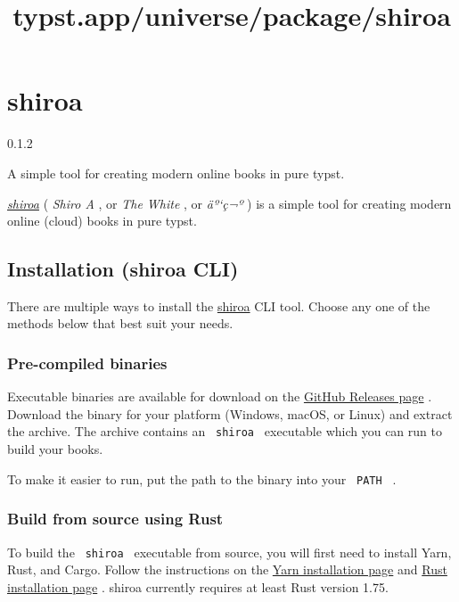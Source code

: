 \title{typst.app/universe/package/shiroa}

\label{banner}
\section{shiroa}\label{shiroa}

{ 0.1.2 }

A simple tool for creating modern online books in pure typst.

\label{readme}
\href{https://github.com/Myriad-Dreamin/shiroa}{\emph{shiroa}} (
\emph{Shiro A} , or \emph{The White} , or \emph{äº`ç¬º} ) is a simple
tool for creating modern online (cloud) books in pure typst.

\subsection{Installation (shiroa CLI)}\label{installation-shiroa-cli}

There are multiple ways to install the
\href{https://github.com/Myriad-Dreamin/shiroa}{shiroa} CLI tool. Choose
any one of the methods below that best suit your needs.

\subsubsection{Pre-compiled binaries}\label{pre-compiled-binaries}

Executable binaries are available for download on the
\href{https://github.com/Myriad-Dreamin/shiroa/releases}{GitHub Releases
page} . Download the binary for your platform (Windows, macOS, or Linux)
and extract the archive. The archive contains an \texttt{\ shiroa\ }
executable which you can run to build your books.

To make it easier to run, put the path to the binary into your
\texttt{\ PATH\ } .

\subsubsection{Build from source using
Rust}\label{build-from-source-using-rust}

To build the \texttt{\ shiroa\ } executable from source, you will first
need to install Yarn, Rust, and Cargo. Follow the instructions on the
\href{https://classic.yarnpkg.com/en/docs/install}{Yarn installation
page} and \href{https://www.rust-lang.org/tools/install}{Rust
installation page} . shiroa currently requires at least Rust version
1.75.

